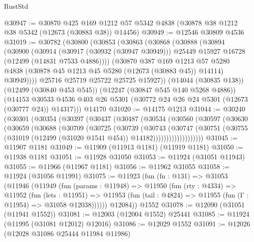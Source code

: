 \begin{lexlean}{RustStd}
\begin{coremodule}
@30947 := @30870
    @425
    @169
    @1212
    @57
    @5342
    @4838
    (@30878 @38 @1212 @38 @5342 (@12673 (@30883 @38)) @14456)
@30949 := @12546 @30809 @4536
@31019 := @30782
    (@30800
      (@30853
        (@30863
          (@30868
            (@30888
              (@30894
                (@30900
                  (@30914
                    (@30917 (@30932 (@30947 @30949)))
                    @25449
                    @15927
                    @16728
                    (@12499 (@14831 @7533 @4886))))
                (@30870
                  @387
                  @169
                  @1213
                  @57
                  @5280
                  @4838
                  (@30878 @45 @1213 @45 @5280 (@12673 (@30883 @45)) @14114)
                  @30949))))
          @25716
          @25719
          @25722
          @25725
          @15927))
      (@14044 (@30835 @138))
      (@12499 (@30840 @453 @545))
      (@12247 (@30847 @545 @140 @5268 @4886))
      (@14153 @30533 @4536 @403 @26 @5301 (@30772 @24 @26 @24 @5301 (@12673 (@30777 @24)) @14317)))
    @14170
@31020 := @14175 @1213
@31044 := @30240
    (@30301
      (@30354
        (@30397
          (@30437
            (@30487
              (@30534
                (@30560
                  (@30597
                    (@30630
                      (@30659
                        (@30688
                          (@30709
                            (@30725
                              (@30739
                                (@30743
                                  (@30747
                                    (@30751
                                      (@30755
                                        (@31019
                                          (@12499 (@31020 @1541 @454))
                                          @14182)))))))))))))))))))
@31045 := @11907 @1181
@31049 := @11909 (@11913 @1181) (@11919 @1181)
@31050 := @11938 @1181
@31051 := @11928 @31050
@31053 := @11924 (@31051 @11943)
@31055 := @11966 (@11967 @1181)
@31056 := @11962 @31055
@31058 := @11924 (@31056 @11991)
@31075 := @11923
    (fun (fn : @131) =>
    @31053
      (@11946
        (@11949
          (fun (params : @11948) =>
          @11950
            (fun (rty : @4334) =>
            @11952
              (fun (lets : @11951) =>
              @11953 (fun (tail : @4824) => @11955 (fun (Γ : @11954) => @31058 @12038))))))
        @12084))
    @1552
@31078 := @12090 (@31051 (@11941 @1552))
@31081 := @12003 (@12004 @1552) @25441
@31085 := @11924 (@11995 (@31081 @12012) @12016)
@31086 := @12029 @1552
@31091 := @12026 (@12028 @31086 @25444 @11984 @11986)

\end{coremodule}
\end{lexlean}
